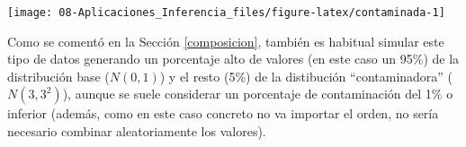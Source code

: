 \documentclass[
]{book}
\theoremstyle{break}
\theoremstyle{definition}
\theoremstyle{definition}
\theoremstyle{definition}
\theoremstyle{remark}
\let\BeginKnitrBlock\begin \let\EndKnitrBlock\end
\begin{document}
\begin{center}\texttt{[image: 08-Aplicaciones\_Inferencia\_files/figure-latex/contaminada-1]} \end{center}

\BeginKnitrBlock{remark}
{}Como se comentó en la Sección \ref{composicion}, también es habitual simular este tipo de datos generando un porcentaje alto de valores (en este caso un 95\%) de la distribución base (\(N(0,1)\)) y el resto (5\%) de la distibución ``contaminadora'' (\(N(3,3^2)\)), aunque se suele considerar un porcentaje de contaminación del 1\% o inferior (además, como en este caso concreto no va importar el orden, no sería necesario combinar aleatoriamente los valores).
\EndKnitrBlock{remark}

\vspace{0.5cm}
\end{document}
